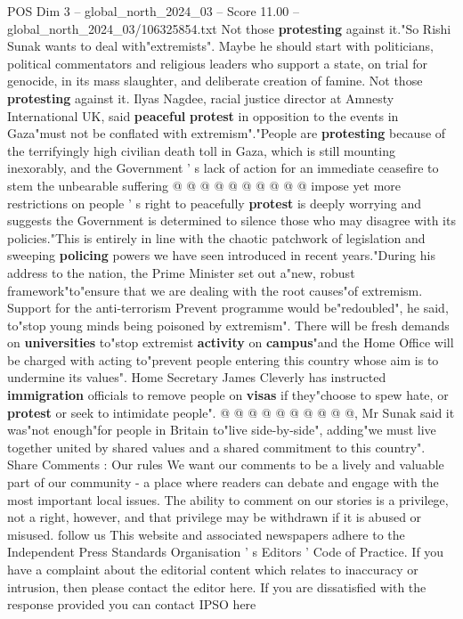 \begin{textsample}{POS Dim 3 – global\_north\_2024\_03 – Score 11.00 – global\_north\_2024\_03/106325854.txt}
Not those \textbf{protesting} against it."So Rishi Sunak wants to deal with"extremists".
Maybe he should start with politicians, political commentators and religious leaders who support a state, on trial for genocide, in its mass slaughter, and deliberate creation of famine.
Not those \textbf{protesting} against it.
Ilyas Nagdee, racial justice director at Amnesty International UK, said \textbf{peaceful} \textbf{protest} in opposition to the events in Gaza"must not be conflated with extremism"."People are \textbf{protesting} because of the terrifyingly high civilian death toll in Gaza, which is still mounting inexorably, and the Government ' s lack of action for an immediate ceasefire to stem the unbearable suffering @ @ @ @ @ @ @ @ @ @ impose yet more restrictions on people ' s right to peacefully \textbf{protest} is deeply worrying and suggests the Government is determined to silence those who may disagree with its policies."This is entirely in line with the chaotic patchwork of legislation and sweeping \textbf{policing} powers we have seen introduced in recent years."During his address to the nation, the Prime Minister set out a"new, robust framework"to"ensure that we are dealing with the root causes"of extremism.
Support for the anti-terrorism Prevent programme would be"redoubled", he said, to"stop young minds being poisoned by extremism".
There will be fresh demands on \textbf{universities} to"stop extremist \textbf{activity} on \textbf{campus}"and the Home Office will be charged with acting to"prevent people entering this country whose aim is to undermine its values".
Home Secretary James Cleverly has instructed \textbf{immigration} officials to remove people on \textbf{visas} if they"choose to spew hate, or \textbf{protest} or seek to intimidate people". @ @ @ @ @ @ @ @ @ @, Mr Sunak said it was"not enough"for people in Britain to"live side-by-side", adding"we must live together united by shared values and a shared commitment to this country".
Share Comments : Our rules We want our comments to be a lively and valuable part of our community - a place where readers can debate and engage with the most important local issues.
The ability to comment on our stories is a privilege, not a right, however, and that privilege may be withdrawn if it is abused or misused. follow us This website and associated newspapers adhere to the Independent Press Standards Organisation ' s Editors ' Code of Practice.
If you have a complaint about the editorial content which relates to inaccuracy or intrusion, then please contact the editor here.
If you are dissatisfied with the response provided you can contact IPSO here

\end{textsample}
